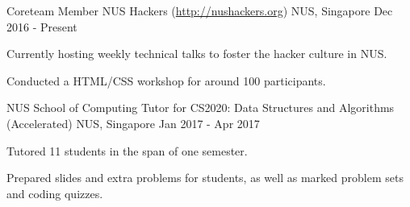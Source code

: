

\begin{cventries}


	\cventry
	{Coreteam Member} %
	{NUS Hackers (\url{http://nushackers.org})} %
	{NUS, Singapore} %
	{Dec 2016 - Present} %
	{ %
		\begin{cvitems}
		\item {Currently hosting weekly technical talks to foster the hacker culture in NUS.}
		\item {Conducted a HTML/CSS workshop for around 100 participants.}
		\end{cvitems}
	}


	\cventry
	{NUS School of Computing} %
	{Tutor for CS2020: Data Structures and Algorithms (Accelerated)} %
	{NUS, Singapore} %
	{Jan 2017 - Apr 2017} %
	{ %
		\begin{cvitems}
		\item {Tutored 11 students in the span of one semester.}
		\item {Prepared slides and extra problems for students, as well as marked problem sets and coding quizzes.}
		\end{cvitems}
	}


\end{cventries}
